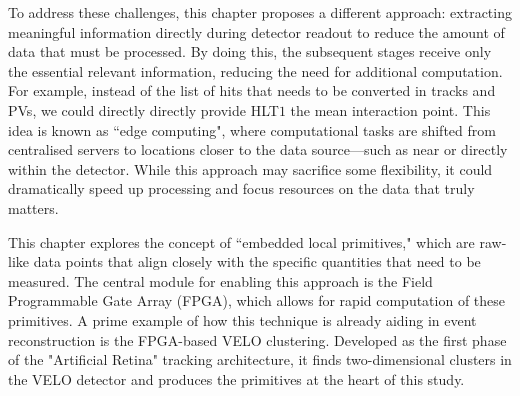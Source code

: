 To address these challenges, this chapter proposes a different approach: extracting meaningful information directly during detector readout to reduce the amount of data that must be processed. By doing this, the subsequent stages receive only the essential relevant information, reducing the need for additional computation. For example, instead of the list of hits that needs to be converted in tracks and PVs, we could directly directly provide HLT$1$ the mean interaction point. This idea is known as ``edge computing", where computational tasks are shifted from centralised servers to locations closer to the data source—such as near or directly within the detector. While this approach may sacrifice some flexibility, it could dramatically speed up processing and focus resources on the data that truly matters.


This chapter explores the concept of ``embedded local primitives," which are raw-like data points that align closely with the specific quantities that need to be measured. The central module for enabling this approach is the Field Programmable Gate Array (FPGA), which allows for rapid computation of these primitives. A prime example of how this technique is already aiding in event reconstruction is the FPGA-based VELO clustering. Developed as the first phase of the "Artificial Retina" tracking architecture, it finds two-dimensional clusters in the VELO detector and produces the primitives at the heart of this study.


